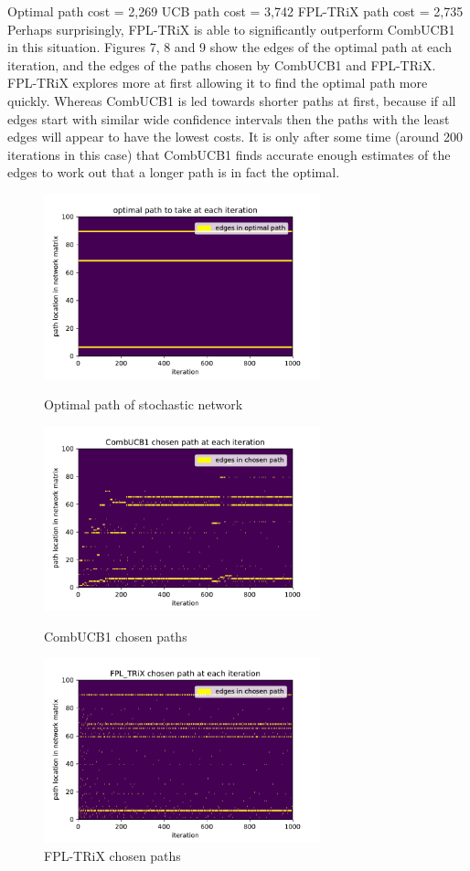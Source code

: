 Optimal path cost = 2,269
UCB path cost = 3,742
FPL-TRiX path cost = 2,735\\

Perhaps surprisingly, FPL-TRiX is able to significantly outperform CombUCB1 in this situation. Figures 7, 8 and 9 show the edges of the optimal path at each iteration, and the edges of the paths chosen by CombUCB1 and FPL-TRiX. FPL-TRiX explores more at first allowing it to find the optimal path more quickly. Whereas CombUCB1 is led towards shorter paths at first, because if all edges start with similar wide confidence intervals then the paths with the least edges will appear to have the lowest costs. It is only after some time (around 200 iterations in this case) that CombUCB1 finds accurate enough estimates of the edges to work out that a longer path is in fact the optimal.\\

\begin{figure}%
  \centering
  \includegraphics[width=8cm]{../plots/stoch_network_opt_paths.pdf}
  \caption{Optimal path of stochastic network}
  \label{}
  \includegraphics[width=8cm]{../plots/stoch_network_UCB1.pdf}
  \caption{CombUCB1 chosen paths}
  \label{}
  \includegraphics[width=8cm]{../plots/stoch_network_FPL.pdf}
  \caption{FPL-TRiX chosen paths}
  \label{}
\end{figure}

